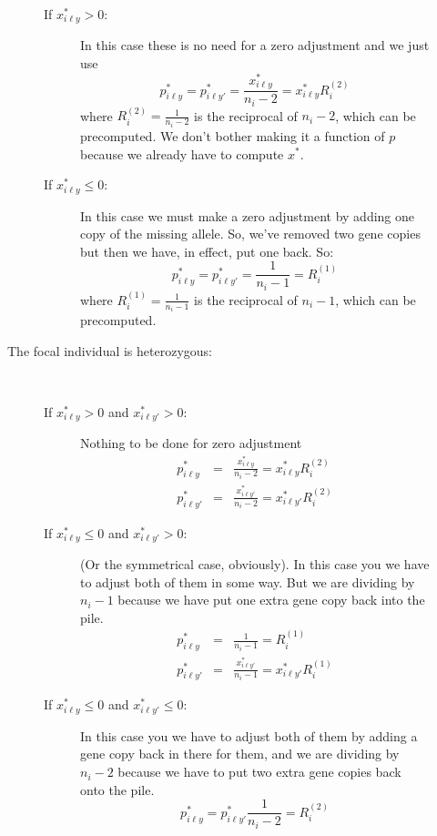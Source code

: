 \documentclass[11pt]{article}
\begin{document}
\begin{description}
\begin{description}
\[		\]
		\begin{description}
			\item [If $x^*_{i\ell y} > 0$:] In this case these is no need for a zero adjustment and we just use
			\[
				p^*_{i\ell y} = p^*_{i\ell y'} = \frac{x^*_{i\ell y}}{n_i - 2} = x^*_{i\ell y} R_i^{(2)}
			\]
			where $R_i^{(2)} = \frac{1}{n_i - 2}$ is the reciprocal of $n_i - 2$, which can be precomputed.  We don't bother
			making it a function of $p$ because we already have to compute $x^*$.
			\item [If $x^*_{i\ell y} \leq 0$:] In this case we must make a zero adjustment by adding one copy of the
			missing allele.  So, we've removed two gene copies but then we have, in effect, put one back.  So:   
			\[
				p^*_{i\ell y} = p^*_{i\ell y'} = \frac{1}{n_i - 1} = R_i^{(1)}
			\]
			where $R_i^{(1)} = \frac{1}{n_i - 1}$ is the reciprocal of $n_i - 1$, which can be precomputed.
		\end{description}
		\item [The focal individual is heterozygous:] ~
		\begin{description}
			\item [If $x^*_{i\ell y} > 0$ and $x^*_{i\ell y'} > 0$:] Nothing to be done for zero adjustment
			\begin{eqnarray*}
				p^*_{i\ell y} & = & \frac{x^*_{i\ell y}}{n_i - 2} = x^*_{i\ell y} R_i^{(2)} \\
				p^*_{i\ell y'} & = &  \frac{x^*_{i\ell y'}}{n_i - 2} = x^*_{i\ell y'} R_i^{(2)}
			\end{eqnarray*}
			\item [If $x^*_{i\ell y} \leq 0$ and $x^*_{i\ell y'} > 0$:] (Or the symmetrical case, obviously).  In this case 
			you we have to adjust both of them in some way.  But we are dividing by $n_i - 1$ because we have put one extra
			gene copy back into the pile.
			\begin{eqnarray*}
				p^*_{i\ell y} & = & \frac{1}{n_i - 1} =  R_i^{(1)} \\
				p^*_{i\ell y'} & = &  \frac{x^*_{i\ell y'}}{n_i - 1} = x^*_{i\ell y'} R_i^{(1)}
			\end{eqnarray*}
			\item [If $x^*_{i\ell y} \leq 0$ and $x^*_{i\ell y'} \leq 0$:]  In this case 
			you we have to adjust both of them by adding a gene copy back in there for them, and we are dividing by $n_i - 2$ because we
			have to put two extra gene copies back onto the pile.
			\[
				p^*_{i\ell y}  = p^*_{i\ell y'} \frac{1}{n_i - 2} =  R_i^{(2)}
			\]

		\end{description}

	\end{description}

\end{description}
\end{document}
